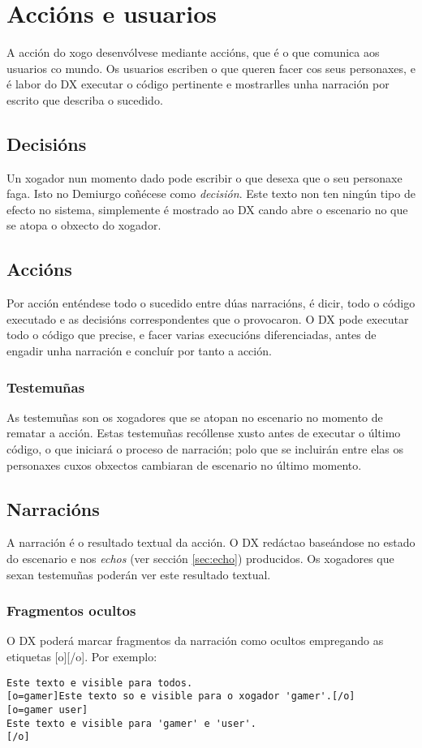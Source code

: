 \chapter{Accións e usuarios}
A acción do xogo desenvólvese mediante accións, que é o que comunica aos
usuarios co mundo. Os usuarios escriben o que queren facer cos seus personaxes,
e é labor do DX executar o código pertinente e mostrarlles unha narración
por escrito que describa o sucedido.
\section{Decisións}
Un xogador nun momento dado pode escribir o que desexa que o seu personaxe faga.
Isto no Demiurgo coñécese como {\it decisión}. Este texto non ten ningún tipo de
efecto no sistema, simplemente é mostrado ao DX cando abre o escenario no que se
atopa o obxecto do xogador.

\section{Accións}
Por acción enténdese todo o sucedido entre dúas narracións, é dicir, todo o
código executado e as decisións correspondentes que o provocaron. O DX pode
executar todo o código que precise, e facer varias execucións diferenciadas,
antes de engadir unha narración e concluír por tanto a acción.
\subsection{Testemuñas}
As testemuñas son os xogadores que se atopan no escenario no momento de rematar
a acción. Estas testemuñas recóllense xusto antes de executar o último código,
o que iniciará o proceso de narración; polo que se incluirán entre elas os
personaxes cuxos obxectos cambiaran de escenario no último momento.

\section{Narracións}
A narración é o resultado textual da acción. O DX redáctao baseándose no estado
do escenario e nos {\it echos} (ver sección \ref{sec:echo}) producidos. Os
xogadores que sexan testemuñas poderán ver este resultado textual.
\subsection{Fragmentos ocultos}
O DX poderá marcar fragmentos da narración como ocultos empregando as etiquetas
[o][/o]. Por exemplo:
\begin{lstlisting}
Este texto e visible para todos.
[o=gamer]Este texto so e visible para o xogador 'gamer'.[/o]
[o=gamer user]
Este texto e visible para 'gamer' e 'user'.
[/o]
\end{lstlisting}